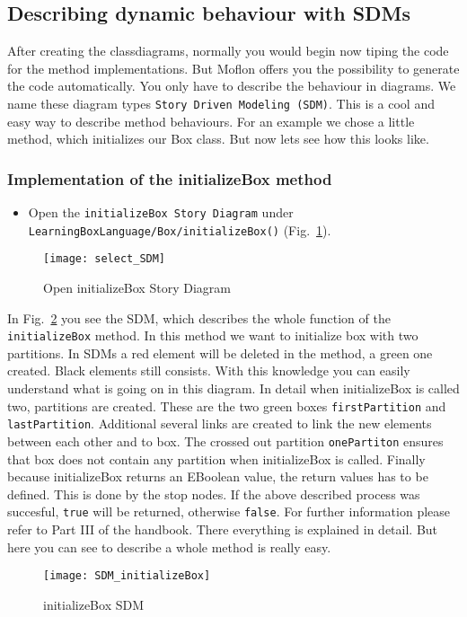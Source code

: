 \newpage
\subsection{Describing dynamic behaviour with SDMs}

After creating the classdiagrams, normally you would begin now tiping the code for the method implementations. But Moflon offers you the possibility to generate the code automatically. You only have to describe the behaviour in diagrams. We name these diagram types \texttt{Story Driven Modeling (SDM)}. This is a cool and easy way to describe method behaviours.
\newline
For an example we chose a little method, which initializes our Box class. But now lets see how this looks like.


\subsubsection{Implementation of the initializeBox method}

\begin{itemize}
\item Open the \texttt{initializeBox Story Diagram} under \texttt{Learning\-Box\-Lan\-guage/Box/initialize\-Box()} (Fig.~\ref{open_deleteNode}).
\end{itemize}
\begin{figure}[htbp]
	\centering
  \texttt{[image: select\_SDM]}
	\caption{Open initializeBox Story Diagram} 
	\label{open_deleteNode} 
\end{figure}

In Fig.~\ref{sdm_initializeBox} you see the SDM, which describes the whole function of the \texttt{initializeBox} method. In this method we want to initialize box with two partitions.
\newline
In SDMs a red element will be deleted in the method, a green one created. Black elements still consists. With this knowledge you can easily understand what is going on in this diagram.
\newline
In detail when initializeBox is called two, partitions are created. These are the two green boxes \texttt{firstPartition} and \texttt{lastPartition}. Additional several links are created to link the new elements between each other and to box.
\newline
The crossed out partition \texttt{onePartiton} ensures that box does not contain any partition when initializeBox is called.
\newline
Finally because initializeBox returns an EBoolean value, the return values has to be defined. This is done by the stop nodes. If the above described process was succesful, \texttt{true} will be returned, otherwise \texttt{false}.
\newline
For further information please refer to Part III of the handbook. There everything is explained in detail. But here you can see to describe a whole method is really easy.

\begin{figure}[htbp]
	\centering
  \texttt{[image: SDM\_initializeBox]}
	\caption{initializeBox SDM} 
	\label{sdm_initializeBox} 
\end{figure}



